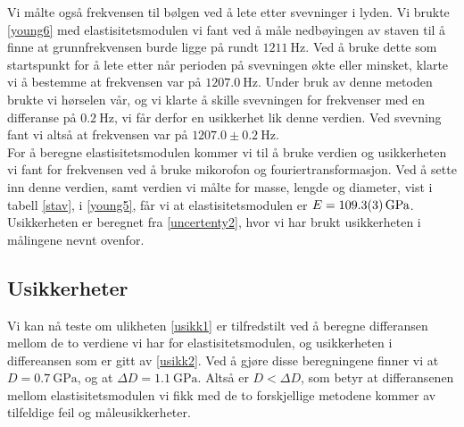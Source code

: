 \documentclass[%
 reprint,
 amsmath,amssymb,
 aps,
 norsk,
 booktabs
]{revtex4-1}
\begin{document}
Vi målte også frekvensen til bølgen ved å lete etter svevninger i lyden. Vi brukte \eqref{young6} med elastisitetsmodulen vi fant ved å måle nedbøyingen av staven til å finne at grunnfrekvensen burde ligge på rundt $\SI{1211}{\hertz}$. Ved å bruke dette som startspunkt for å lete etter når perioden på svevningen økte eller minsket, klarte vi å bestemme at frekvensen var på $\SI{1207.0}{\hertz}$. Under bruk av denne metoden brukte vi hørselen vår, og vi klarte å skille svevningen for frekvenser med en differanse på $\SI{0.2}{\hertz}$, vi får derfor en usikkerhet lik denne verdien. Ved svevning fant vi altså at frekvensen var på $1207.0\pm\SI{0.2}{\hertz}$.\\
For å beregne elastisitetsmodulen kommer vi til å bruke verdien og usikkerheten vi fant for frekvensen ved å bruke mikorofon og fouriertransformasjon. Ved å sette inn denne verdien, samt verdien vi målte for masse, lengde og diameter, vist i tabell \vref{stav}, i \eqref{young5}, får vi at elastisitetsmodulen er $E = \SI{109.3\pm0.3}{\giga\pascal}$. Usikkerheten er beregnet fra \eqref{uncertenty2}, hvor vi har brukt usikkerheten i målingene nevnt ovenfor.
\subsection{Usikkerheter}
Vi kan nå teste om ulikheten \eqref{usikk1} er tilfredstilt ved å beregne differansen mellom de to verdiene vi har for elastisitetsmodulen, og usikkerheten i differeansen som er gitt av \eqref{usikk2}. Ved å gjøre disse beregningene finner vi at $D = \SI{0.7}{\giga\pascal}$, og at $\Delta D = \SI{1.1}{\giga\pascal}$. Altså er $D<\Delta D$, som betyr at differansenen mellom elastisitetsmodulen vi fikk med de to forskjellige metodene kommer av tilfeldige feil og måleusikkerheter.
\end{document}
